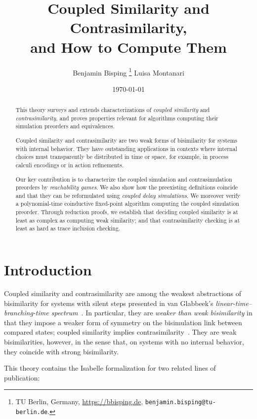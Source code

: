 \documentclass[10pt,a4paper]{article}
\title{ \textbf{Coupled Similarity and Contrasimilarity,} \\ \Large and How to Compute Them }
\author{ Benjamin Bisping%
  \footnote{TU Berlin, Germany,
    \url{https://bbisping.de}, \texttt{benjamin.bisping@tu-berlin.de}.}%
  \qquad Luisa Montanari%
 }
\date{\today}
\begin{document}
\maketitle

\begin{abstract}
\noindent
This theory surveys and extends characterizations of \emph{coupled similarity} and \emph{contrasimilarity},
and proves properties relevant for algorithms computing their simulation preorders and equivalences.

Coupled similarity and contrasimilarity are two weak forms of bisimilarity for systems with
internal behavior.
They have outstanding applications in contexts where internal choices must transparently be
distributed in time or space, for example, in process calculi encodings or in action refinements.

Our key contribution is to characterize the coupled simulation and contrasimulation preorders by \emph{reachability games}.
We also show how the preexisting definitions coincide and that they can be reformulated using \emph{coupled delay simulations}.
We moreover verify a polynomial-time coinductive fixed-point algorithm computing the coupled simulation preorder.
Through reduction proofs, we establish that deciding coupled similarity is at least as complex
as computing weak similarity; and that contrasimilarity checking is at least as hard as trace inclusion
checking.
\end{abstract}

\tableofcontents

\section{Introduction}

Coupled similarity and contrasimilarity are among the weakest abstractions of bisimilarity for systems
with silent steps presented in van Glabbeek's \emph{linear-time--branching-time spectrum}~\cite{glabbeek1993ltbt}.
In particular, they are \emph{weaker than weak bisimilarity} in that they impose a weaker form of
symmetry on the bisimulation link between compared states; coupled similarity implies
contrasimilarity~\cite{bnp2020coupledsim32}. They are weak bisimilarities, however, in the sense
that, on systems with no internal behavior, they coincide with strong bisimilarity.

This theory contains the Isabelle formalization for two related lines of publication:
\end{document}
